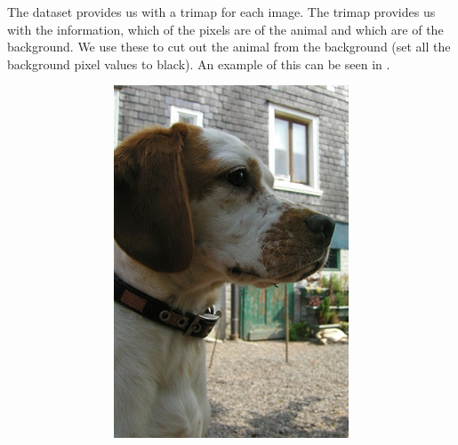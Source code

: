 The dataset provides us with a trimap for each image. The trimap provides us with the information, which of the pixels are of the animal and which are of the background. We use these to cut out the animal from the background (set all the background pixel values to black). An example of this can be seen in .
\begin{figure}[!ht]
    \centering
    \begin{subfigure}{0.55\textwidth}
        \begin{subfigure}[t]{0.40\textwidth}
            \includegraphics[width=\textwidth]{Figures/datasets/beagele.jpg}
            \label{fig:original:example}
        \end{subfigure}\hfill
        \begin{subfigure}[t]{0.40\textwidth}

\end{subfigure}
\end{subfigure}
\end{figure}
